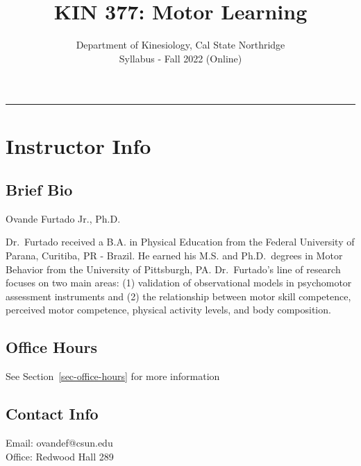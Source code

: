 \documentclass[
  letterpaper,
  DIV=11,
  numbers=noendperiod,
  oneside]{scrartcl}
\title{KIN 377: Motor Learning}
\subtitle{Department of Kinesiology, Cal State Northridge\\
Syllabus - Fall 2022 (Online)}
\author{}
\date{}
\renewcommand*\contentsname{Table of contents}
\newcommand\contentsname{Table of contents}
\begin{document}
\maketitle
\ifdefined\Shaded\renewenvironment{Shaded}{\begin{tcolorbox}[interior hidden, enhanced, breakable, borderline west={3pt}{0pt}{shadecolor}, sharp corners, frame hidden, boxrule=0pt]}{\end{tcolorbox}}\fi

\renewcommand*\contentsname{Table of contents}
{
\hypersetup{linkcolor=}
\setcounter{tocdepth}{3}
\tableofcontents
}
\begin{center}\rule{0.5\linewidth}{0.5pt}\end{center}

\hypertarget{sec-instructor-info}{%
\section{Instructor Info}\label{sec-instructor-info}}

\hypertarget{brief-bio}{%
\subsection{Brief Bio}\label{brief-bio}}

Ovande Furtado Jr., Ph.D.

Dr.~Furtado received a B.A. in Physical Education from the Federal
University of Parana, Curitiba, PR - Brazil. He earned his M.S. and
Ph.D.~degrees in Motor Behavior from the University of Pittsburgh, PA.
Dr.~Furtado's line of research focuses on two main areas: (1) validation
of observational models in psychomotor assessment instruments and (2)
the relationship between motor skill competence, perceived motor
competence, physical activity levels, and body composition.

\hypertarget{office-hours}{%
\subsection{Office Hours}\label{office-hours}}

See Section~\ref{sec-office-hours} for more information

\hypertarget{contact-info}{%
\subsection{Contact Info}\label{contact-info}}

Email: ovandef@csun.edu\\
Office: Redwood Hall 289
\end{document}

